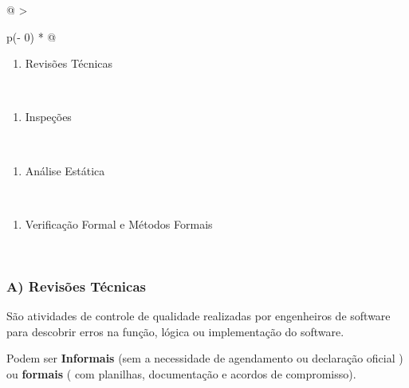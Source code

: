 \documentclass[
]{book}
\providecommand{\tightlist}{%
  \setlength{\itemsep}{0pt}\setlength{\parskip}{0pt}}
\begin{document}
\begin{longtable}[]{@{}
  >{\raggedright\arraybackslash}p{(\columnwidth - 0\tabcolsep) * }@{}}
\caption{Os tipos de TÉCNICAS ESTÁTICAS}\tabularnewline
\toprule\noalign{}
\endfirsthead
\endhead
\bottomrule\noalign{}
\endlastfoot
\begin{minipage}[t]{\linewidth}\raggedright
\begin{enumerate}
\def\labelenumi{\alph{enumi})}
\tightlist
\item
  Revisões Técnicas
\end{enumerate}
\end{minipage} \\
\begin{minipage}[t]{\linewidth}\raggedright
\begin{enumerate}
\def\labelenumi{\alph{enumi})}
\setcounter{enumi}{1}
\tightlist
\item
  Inspeções
\end{enumerate}
\end{minipage} \\
\begin{minipage}[t]{\linewidth}\raggedright
\begin{enumerate}
\def\labelenumi{\alph{enumi})}
\setcounter{enumi}{2}
\tightlist
\item
  Análise Estática
\end{enumerate}
\end{minipage} \\
\begin{minipage}[t]{\linewidth}\raggedright
\begin{enumerate}
\def\labelenumi{\alph{enumi})}
\setcounter{enumi}{3}
\tightlist
\item
  Verificação Formal e Métodos Formais
\end{enumerate}
\end{minipage} \\
\end{longtable}

\subsubsection{A) Revisões Técnicas}\label{a-revisuxf5es-tuxe9cnicas}

São atividades de controle de qualidade realizadas por engenheiros de software para descobrir erros na função, lógica ou implementação do software.

Podem ser \textbf{Informais} (sem a necessidade de agendamento ou declaração oficial ) ou \textbf{formais} ( com planilhas, documentação e acordos de compromisso).
\end{document}
